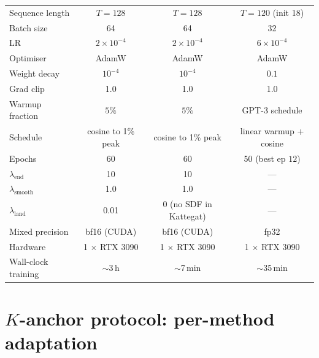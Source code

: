 \documentclass[11pt]{article}
\begin{document}
\begin{table}[h]
\begin{tabular}{lccc}
    Sequence length             & $T=128$                     & $T=128$                     & $T=120$ (init 18) \\
    Batch size                  & 64                          & 64                          & 32 \\
    LR                          & $2\!\times\!10^{-4}$        & $2\!\times\!10^{-4}$        & $6\!\times\!10^{-4}$ \\
    Optimiser                   & AdamW                       & AdamW                       & AdamW \\
    Weight decay                & $10^{-4}$                   & $10^{-4}$                   & $0.1$ \\
    Grad clip                   & 1.0                         & 1.0                         & 1.0 \\
    Warmup fraction             & $5\%$                       & $5\%$                       & GPT-3 schedule \\
    Schedule                    & cosine to 1\% peak          & cosine to 1\% peak          & linear warmup + cosine \\
    Epochs                      & 60                          & 60                          & 50 (best ep $12$) \\
    $\lambda_{\text{end}}$      & 10                          & 10                          & --- \\
    $\lambda_{\text{smooth}}$   & 1.0                         & 1.0                         & --- \\
    $\lambda_{\text{land}}$     & 0.01                        & 0 (no SDF in Kattegat)      & --- \\
    Mixed precision             & bf16 (CUDA)                 & bf16 (CUDA)                 & fp32 \\
    Hardware                    & 1 $\times$ RTX 3090         & 1 $\times$ RTX 3090         & 1 $\times$ RTX 3090 \\
    Wall-clock training         & $\sim$3\,h                  & $\sim$7\,min                & $\sim$35\,min \\
    \bottomrule
  \end{tabular}
\end{table}

\section{$K$-anchor protocol: per-method adaptation}
\label{sec:appendix_k_anchor}
\end{document}
